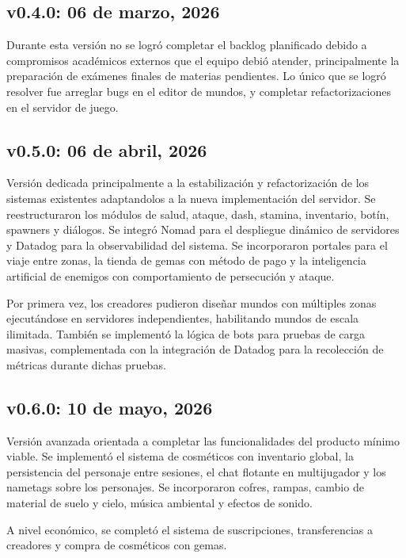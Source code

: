 \subsection{v0.4.0: 06 de marzo, 2026}

Durante esta versión no se logró completar el backlog planificado debido a compromisos académicos 
externos que el equipo debió atender, principalmente la preparación de exámenes finales de materias pendientes.
Lo único que se logró resolver fue arreglar bugs en el editor de mundos, y completar refactorizaciones en el servidor
de juego.

\subsection{v0.5.0: 06 de abril, 2026}

Versión dedicada principalmente a la estabilización y refactorización de los sistemas existentes adaptandolos
a la nueva implementación del servidor.
Se reestructuraron los módulos de salud, ataque, dash, stamina, inventario, botín, spawners y diálogos. 
Se integró Nomad para el despliegue dinámico de servidores y Datadog para la observabilidad del sistema. 
Se incorporaron portales para el viaje entre zonas, la tienda de gemas con método de pago y la 
inteligencia artificial de enemigos con comportamiento de persecución y ataque. 

\vspace{0.25cm}

Por primera vez, los creadores pudieron diseñar mundos con múltiples zonas ejecutándose en servidores independientes, 
habilitando mundos de escala ilimitada. También se implementó la lógica de bots para pruebas de carga 
masivas, complementada con la integración de Datadog para la recolección de métricas durante dichas pruebas. 

\subsection{v0.6.0: 10 de mayo, 2026}

Versión avanzada orientada a completar las funcionalidades del producto mínimo viable. Se implementó el 
sistema de cosméticos con inventario global, la persistencia del personaje entre sesiones, el chat 
flotante en multijugador y los nametags sobre los personajes. Se incorporaron cofres, rampas, cambio 
de material de suelo y cielo, música ambiental y efectos de sonido. 

A nivel económico, se completó el sistema de suscripciones, transferencias a creadores y compra de 
cosméticos con gemas.

